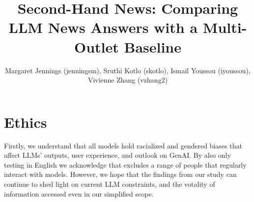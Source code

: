 \documentclass[conference=acm]{confpaper}
\title{Second-Hand News: Comparing LLM News Answers with a Multi-Outlet Baseline}
\author{ Margaret Jennings (jenningsm), Sruthi Kotlo (skotlo), Ismail Youssou (iyoussou), Vivienne Zhang (vzhang2) }
\begin{document}


\maketitle




\label{lastpage}

\section{Ethics}

Firstly, we understand that all models hold racialized and gendered biases that affect LLMs' outputs, user experience, and outlook on GenAI. By also only testing in English we acknowledge that excludes a range of people that regularly interact with models. However, we hope that the findings from our study can continue to shed light on current LLM constraints, and the votality of information accessed even in our simplified scope.



\newpage
\printbibliography

\vfill
\pagebreak
\end{document}
